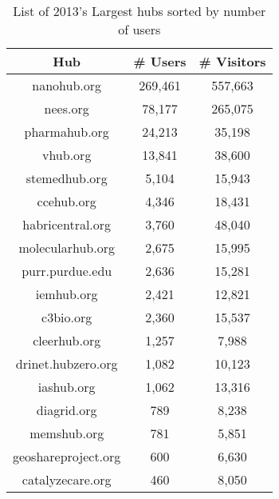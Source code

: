 \begin{table}[t]
  \centering
  \caption{List of 2013's Largest hubs sorted by number of users}
  \begin{tabular}{ | c | c | c | }
    \hline
    Hub                                                          & \# Users  & \# Visitors \\ \hline
    nanohub.org \cite{nanohub_usage:2013:Online}                 & 269,461   & 557,663 \\ \hline
    nees.org \cite{nees_usage:2013:Online}                       &  78,177   & 265,075 \\ \hline
    pharmahub.org \cite{pharmahub_usage:2013:Online}             &  24,213   &  35,198 \\ \hline
    vhub.org \cite{vhub_usage:2013:Online}                       &  13,841   &  38,600 \\ \hline
    stemedhub.org \cite{stemedhub_usage:2013:Online}             &   5,104   &  15,943 \\ \hline
    ccehub.org \cite{ccehub_usage:2013:Online}                   &   4,346   &  18,431 \\ \hline
    habricentral.org \cite{habricentral_usage:2013:Online}       &   3,760   &  48,040 \\ \hline
    molecularhub.org \cite{molecularhub_usage:2013:Online}       &   2,675   &  15,995 \\ \hline
    purr.purdue.edu \cite{purr_usage:2013:Online}                &   2,636   &  15,281 \\ \hline
    iemhub.org \cite{iemhub_usage:2013:Online}                   &   2,421   &  12,821 \\ \hline
    c3bio.org \cite{c3bio_usage:2013:Online}                     &   2,360   &  15,537 \\ \hline
    cleerhub.org \cite{cleerhub_usage:2013:Online}               &   1,257   &   7,988 \\ \hline
    drinet.hubzero.org \cite{drinet_usage:2013:Online}           &   1,082   &  10,123 \\ \hline
    iashub.org \cite{iashub_usage:2013:Online}                   &   1,062   &  13,316 \\ \hline
    diagrid.org \cite{diagrid_usage:2013:Online}                 &     789   &   8,238 \\ \hline
    memshub.org  \cite{memshub_usage:2013:Online}                &     781   &   5,851 \\ \hline
    geoshareproject.org \cite{geoshareproject_usage:2013:Online} &     600   &   6,630 \\ \hline
    catalyzecare.org \cite{catalyzecare_usage:2013:Online}       &     460   &   8,050 \\ \hline
  \end{tabular}
  \label{tab:topHubsByUser}
\end{table}


